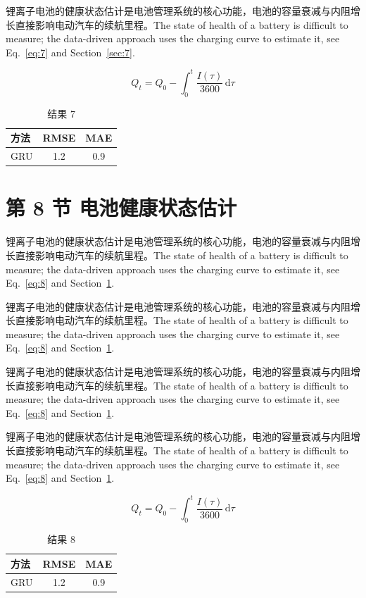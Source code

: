 \documentclass[UTF8,fontset=mac]{ctexart}
\begin{document}
锂离子电池的健康状态估计是电池管理系统的核心功能，电池的容量衰减与内阻增长直接影响电动汽车的续航里程\cite{a2020}。The state of health of a battery is difficult to measure; the data-driven approach uses the charging curve to estimate it, see Eq.~\eqref{eq:7} and Section~\ref{sec:7}.

\begin{equation}\label{eq:7}
  Q_t = Q_0 - \int_0^t \frac{I(\tau)}{3600}\,\mathrm{d}\tau
\end{equation}
\begin{table}[h]\centering\begin{tabular}{lcc}\toprule 方法 & RMSE & MAE\\\midrule GRU & 1.2 & 0.9\\\bottomrule\end{tabular}\caption{结果 7}\end{table}

\section{第 8 节 电池健康状态估计}\label{sec:8}
锂离子电池的健康状态估计是电池管理系统的核心功能，电池的容量衰减与内阻增长直接影响电动汽车的续航里程\cite{a2020}。The state of health of a battery is difficult to measure; the data-driven approach uses the charging curve to estimate it, see Eq.~\eqref{eq:8} and Section~\ref{sec:8}.

锂离子电池的健康状态估计是电池管理系统的核心功能，电池的容量衰减与内阻增长直接影响电动汽车的续航里程\cite{a2020}。The state of health of a battery is difficult to measure; the data-driven approach uses the charging curve to estimate it, see Eq.~\eqref{eq:8} and Section~\ref{sec:8}.

锂离子电池的健康状态估计是电池管理系统的核心功能，电池的容量衰减与内阻增长直接影响电动汽车的续航里程\cite{a2020}。The state of health of a battery is difficult to measure; the data-driven approach uses the charging curve to estimate it, see Eq.~\eqref{eq:8} and Section~\ref{sec:8}.

锂离子电池的健康状态估计是电池管理系统的核心功能，电池的容量衰减与内阻增长直接影响电动汽车的续航里程\cite{a2020}。The state of health of a battery is difficult to measure; the data-driven approach uses the charging curve to estimate it, see Eq.~\eqref{eq:8} and Section~\ref{sec:8}.

\begin{equation}\label{eq:8}
  Q_t = Q_0 - \int_0^t \frac{I(\tau)}{3600}\,\mathrm{d}\tau
\end{equation}
\begin{table}[h]\centering\begin{tabular}{lcc}\toprule 方法 & RMSE & MAE\\\midrule GRU & 1.2 & 0.9\\\bottomrule\end{tabular}\caption{结果 8}\end{table}
\end{document}
